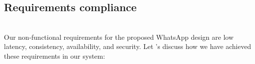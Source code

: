 

\subsection{Requirements compliance}\label{6HUkOi81ULZId-hQclKsq}
\\
Our non-functional requirements for the proposed WhatsApp design are low latency, consistency, availability, and security. Let 's discuss how we have achieved these requirements in our system:

